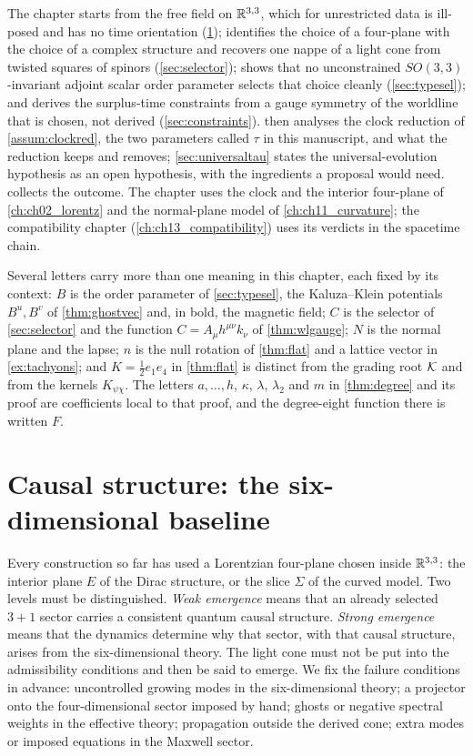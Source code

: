 The chapter starts from the free field on
$\mathbb{R}^{3,3}$, which for unrestricted data is ill-posed and has no time orientation (\cref{sec:baseline}); identifies the choice of a four-plane with the choice of a
complex structure and recovers one nappe of a light cone from twisted squares of spinors (\cref{sec:selector}); shows that no unconstrained
$SO(3,3)$-invariant adjoint scalar order parameter selects that choice cleanly (\cref{sec:typesel}); and derives the surplus-time constraints from a
gauge symmetry of the worldline that is chosen, not derived (\cref{sec:constraints}).  then analyses the clock reduction of
\cref{assum:clockred}, the two parameters called $\tau$ in this manuscript, and what the reduction keeps and removes; \cref{sec:universaltau} states
the universal-evolution hypothesis as an open hypothesis, with the ingredients a proposal would need.  collects the
outcome. The chapter uses the clock and the interior four-plane of \cref{ch:ch02_lorentz} and the normal-plane model of \cref{ch:ch11_curvature};
the compatibility chapter (\cref{ch:ch13_compatibility}) uses its verdicts in the spacetime chain.

Several letters carry more than one meaning in this chapter, each fixed by its context: $B$ is the order parameter of \cref{sec:typesel}, the
Kaluza--Klein potentials $B^u,B^v$ of \cref{thm:ghostvec} and, in bold, the magnetic field; $C$ is the selector of \cref{sec:selector} and the
function $C=A_\mu h^{\mu\nu}k_\nu$ of \cref{thm:wlgauge}; $N$ is the normal plane and the lapse; $n$ is the null rotation of \cref{thm:flat} and a
lattice vector in \cref{ex:tachyons}; and $K=\tfrac12e_1e_4$ in \cref{thm:flat} is distinct from the grading root $\mathcal K$ and from the kernels $K_{\psi\chi}$.
The letters $a,\dots,h$, $\kappa$, $\lambda$, $\lambda_2$ and $m$ in \cref{thm:degree} and its proof are coefficients local to that proof, and the
degree-eight function there is written $F$.



\section{Causal structure: the six-dimensional baseline}
\label{sec:baseline}

Every construction so far has used a Lorentzian four-plane chosen inside $\mathbb{R}^{3,3}$: the interior plane $E$ of the Dirac structure, or the slice $\Sigma$
of the curved model. Two levels must be distinguished. \emph{Weak emergence} means that an already selected $3{+}1$ sector carries a
consistent quantum causal structure. \emph{Strong emergence} means that the dynamics determine why that sector, with that causal structure, arises from the
six-dimensional theory. The light cone must not be put into the admissibility conditions and then be said to emerge. We fix the failure conditions in advance:
uncontrolled growing modes in the six-dimensional theory; a projector onto the four-dimensional sector imposed by hand; ghosts or negative spectral weights in
the effective theory; propagation outside the derived cone; extra modes or imposed equations in the Maxwell sector.

